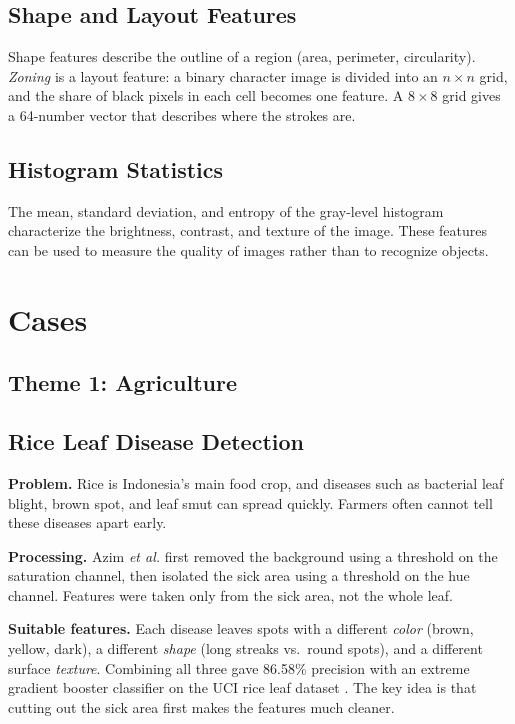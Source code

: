 \documentclass[conference]{IEEEtran}
\begin{document}
\subsection{Shape and Layout Features}
Shape features describe the outline of a region (area, perimeter, circularity). \emph{Zoning} is a layout feature: a binary character image is divided into an $n \times n$ grid, and the share of black pixels in each cell becomes one feature. A $8\times 8$ grid gives a 64-number vector that describes where the strokes are.

\subsection{Histogram Statistics}
The mean, standard deviation, and entropy of the gray-level histogram characterize the brightness, contrast, and texture of the image. These features can be used to measure the quality of images rather than to recognize objects.

\section{Cases}

\subsection*{Theme 1: Agriculture}

\subsection{Rice Leaf Disease Detection}
\textbf{Problem.} Rice is Indonesia's main food crop, and diseases such as bacterial leaf blight, brown spot, and leaf smut can spread quickly. Farmers often cannot tell these diseases apart early.

\textbf{Processing.} Azim \emph{et al.} \cite{azim} first removed the background using a threshold on the saturation channel, then isolated the sick area using a threshold on the hue channel. Features were taken only from the sick area, not the whole leaf.

\textbf{Suitable features.} Each disease leaves spots with a different \emph{color} (brown, yellow, dark), a different \emph{shape} (long streaks vs.\ round spots), and a different surface \emph{texture}. Combining all three gave 86.58\% precision with an extreme gradient booster classifier on the UCI rice leaf dataset \cite{azim}. The key idea is that cutting out the sick area first makes the features much cleaner.
\end{document}
